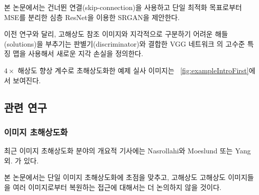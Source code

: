 \documentclass[10pt,twocolumn,letterpaper]{article}
\newcommand{\kor}[1]{#1}
\newcommand{\eng}[1]{}
\newcommand{\summary}[1]{}
\begin{document}
\eng{
In this work we propose a \ac{SRGAN} for which we employ a deep \ac{ResNet} with skip-connection and diverge from \ac{MSE} as the sole optimization target.
}\kor{
본 논문에서는 건너뛴 연결(skip-connection)을 사용하고 단일 최적화 목표로부터 \ac{MSE}를 분리한 심층 \ac{ResNet}을 이용한 \ac{SRGAN}을 제안한다.
}\eng{
 Different from previous works, we define a novel perceptual loss using high-level feature maps of the VGG network \cite{simonyan2014very,Johnson16PercepLoss,bruna2016super} combined with a discriminator that encourages solutions perceptually hard to distinguish from the \ac{HR} reference images.
}\kor{
 이전 연구와 달리, \ac{고해상도} 참조 이미지와 지각적으로 구분하기 어려운 해들(solutions)을 부추기는 판별기(discriminator)와 결합한 VGG 네트워크 \cite{simonyan2014very,Johnson16PercepLoss,bruna2016super}의 고수준 특징 맵을 사용해서 새로운 지각 손실을 정의한다.
}
\eng{
An example photo-realistic image that was super-resolved with a $4\times$ upscaling factor is shown in \figurename~\ref{fig:exampleIntroFirst}.
}\kor{
$4\times$ 해상도 향상 계수로 초해상도화한 예제 실사 이미지는 \figurename~\ref{fig:exampleIntroFirst}에서 보여진다.
}

\summary{
본 논문에서는 건너뛴 연결과 단일 최적화 목표로부터 MSE를 분리한 ResNet을 사용한 SRGAN을 제안하고, VGG 네트워크의 고수준 특징 맵을 사용해 새로운 지각 손실을 정의함.
}

\subsection{관련 연구}
\subsubsection{이미지 초해상도화}
\eng{
Recent overview articles on image \ac{SR} include Nasrollahi and Moeslund \cite{Nasrollahi2014} or Yang et al. \cite{Yang14benchmark}.
}\kor{
최근 이미지 \ac{초해상도화} 분야의 개요적 기사에는 Nasrollahi와 Moeslund \cite{Nasrollahi2014} 또는 Yang 외. 가 있다.
}\eng{
Here we will focus on \ac{SISR} and will not further discuss approaches that recover \ac{HR} images from multiple images \cite{Borman1998aSurvey,Farsiu2004}.
}\kor{
본 논문에서는 \ac{단일 이미지 초해상도화}에 초점을 맞추고, 고해상도 \ac{고해상도} 이미지들을 여러 이미지로부터 복원하는 \cite{Borman1998aSurvey,Farsiu2004} 접근에 대해서는 더 논의하지 않을 것이다.
}

\summary{
이미지 초해상화 분야의 개요적 기사 및 본 논문에서 다루는 세부 분야 제시
}
\end{document}
